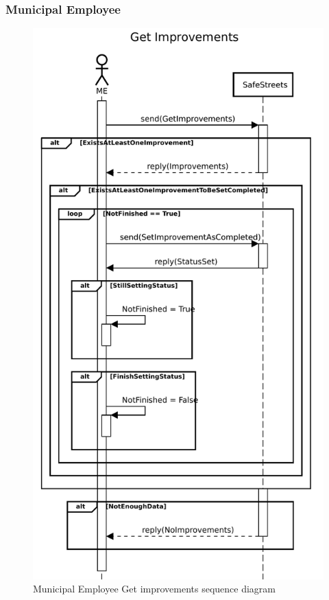 					\subsubsection{Municipal Employee}
						\begin{figure}[!h]
								\centering
							\includegraphics[height=0.7\textheight] {images/SequenceDiagram/Authority/ME/GetImprovements.pdf}
								\caption{Municipal Employee Get improvements sequence diagram}
						\end{figure}
					\clearpage

